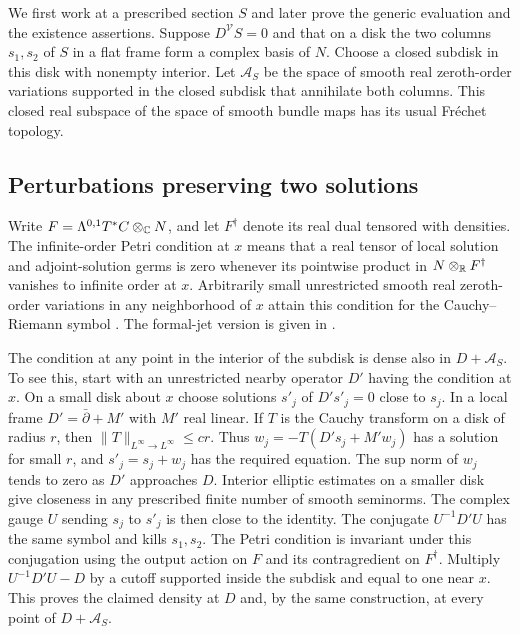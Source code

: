 We first work at a prescribed section $S$ and later prove the generic
evaluation and the existence assertions. Suppose $D^{\mathcal V}S=0$
and that on a disk the two columns $s_1,s_2$ of $S$ in a flat frame
form a complex basis of $N$. Choose a closed subdisk in this disk with
nonempty interior. Let $\mathcal A_S$ be the space of smooth real
zeroth-order variations supported in the closed subdisk that annihilate
both columns. This closed real subspace of the space of smooth bundle
maps has its usual Fr\'echet topology.

\subsection{Perturbations preserving two solutions}
Write $F=\Lambda^{0,1}T^*C\otimes_{\mathbb C}N$, and let $F^\dagger$
denote its real dual tensored with densities. The infinite-order Petri
condition at $x$ means that a real tensor of local solution and
adjoint-solution germs is zero whenever its pointwise product in
$N\otimes_{\mathbb R}F^\dagger$ vanishes to infinite order at $x$.
Arbitrarily small unrestricted smooth real zeroth-order variations in
any neighborhood of $x$ attain this condition for the Cauchy--Riemann
symbol \cite[Definition~5.1 and Corollary~5.10]{wendl}. The formal-jet
version is given in \cite[Definition~1.6.3 and Theorems~1.6.17,~2.5.3]{dwbn}.

The condition at any point in the interior of the subdisk is dense
also in $D+\mathcal A_S$. To see this, start with an unrestricted
nearby operator $D'$ having the condition at $x$. On a small disk
about $x$ choose solutions $s'_j$ of $D's'_j=0$ close to $s_j$.
In a local frame $D'=\bar\partial+M'$ with $M'$ real linear.
If $T$ is the Cauchy transform on a disk of radius $r$, then
$\|T\|_{L^\infty\to L^\infty}\leq c r$. Thus
$w_j=-T(D's_j+M'w_j)$ has a solution for small $r$, and
$s'_j=s_j+w_j$ has the required equation. The sup norm of $w_j$
tends to zero as $D'$ approaches $D$. Interior elliptic estimates
on a smaller disk give closeness in any prescribed finite number of
smooth seminorms. The complex gauge $U$ sending $s_j$ to $s'_j$ is
then close to the identity. The conjugate $U^{-1}D'U$ has the same
symbol and kills $s_1,s_2$. The Petri condition is invariant under
this conjugation using the output action on $F$ and its contragredient
on $F^\dagger$. Multiply $U^{-1}D'U-D$ by a cutoff supported inside
the subdisk and equal to one near $x$. This proves the claimed density
at $D$ and, by the same construction, at every point of $D+\mathcal A_S$.

